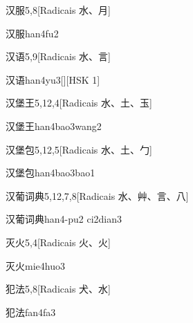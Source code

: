 \begin{entry}{汉服}{5,8}[Radicais ⽔、⽉]
  \begin{phonetics}{汉服}{han4fu2}
  \end{phonetics}
\end{entry}

\begin{entry}{汉语}{5,9}[Radicais ⽔、⾔]
  \begin{phonetics}{汉语}{han4yu3}[][HSK 1]
  \end{phonetics}
\end{entry}

\begin{entry}{汉堡王}{5,12,4}[Radicais ⽔、⼟、⽟]
  \begin{phonetics}{汉堡王}{han4bao3wang2}
  \end{phonetics}
\end{entry}

\begin{entry}{汉堡包}{5,12,5}[Radicais ⽔、⼟、⼓]
  \begin{phonetics}{汉堡包}{han4bao3bao1}
  \end{phonetics}
\end{entry}

\begin{entry}{汉葡词典}{5,12,7,8}[Radicais ⽔、⾋、⾔、⼋]
  \begin{phonetics}{汉葡词典}{han4-pu2 ci2dian3}
  \end{phonetics}
\end{entry}

\begin{entry}{灭火}{5,4}[Radicais ⽕、⽕]
  \begin{phonetics}{灭火}{mie4huo3}
  \end{phonetics}
\end{entry}

\begin{entry}{犯法}{5,8}[Radicais ⽝、⽔]
  \begin{phonetics}{犯法}{fan4fa3}
  \end{phonetics}
\end{entry}

